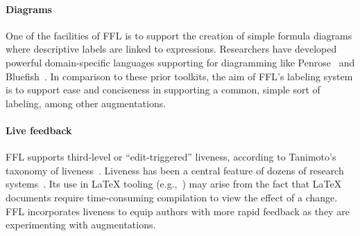 \paragraph{Diagrams}
One of the facilities of FFL is to support the creation of simple formula diagrams where descriptive labels are linked to expressions. Researchers have developed powerful domain-specific languages supporting for diagramming like Penrose~\cite{ref:ye2020penrose} and Bluefish~\cite{ref:pollock2022bluefish}. In comparison to these prior toolkits, the aim of FFL's labeling system is to support ease and conciseness in supporting a common, simple sort of labeling, among other augmentations.

\paragraph{Live feedback}
FFL supports third-level or ``edit-triggered'' liveness, according to Tanimoto's taxonomy of liveness~\cite{ref:tanimoto1990viva}. Liveness has been a central feature of dozens of research systems~\cite{ref:rein2018exploratory}. Its use in LaTeX tooling (e.g.,~\cite{ref:gobert2022ilatex,ref:dragicevic2011gliimpse}) may arise from the fact that LaTeX documents require time-consuming compilation to view the effect of a change. FFL incorporates liveness to equip authors with more rapid feedback as they are experimenting with augmentations.
